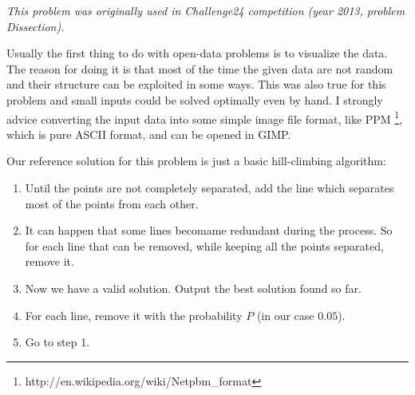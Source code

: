 


\textit{This problem was originally used in Challenge24 competition (year 2013, problem Dissection).}

Usually the first thing to do with open-data problems is to visualize the data.
The reason for doing it is that most of the time the given data are not random
and their structure can be exploited in some ways. This was also true for this
problem and small inputs could be solved optimally even by hand.
I strongly advice converting the input data into some simple image file format,
like PPM \footnote{http://en.wikipedia.org/wiki/Netpbm\_format}, which is pure
ASCII format, and can be opened in GIMP.

Our reference solution for this problem is just a basic hill-climbing algorithm:
\begin{enumerate}
\item Until the points are not completely separated, add the line which separates most
of the points from each other.
\item It can happen that some lines becomame redundant during the process. So for each
line that can be removed, while keeping all the points separated, remove it.
\item Now we have a valid solution. Output the best solution found so far.
\item For each line, remove it with the probability $P$ (in our case $0.05$).
\item Go to step 1.
\end{enumerate}
